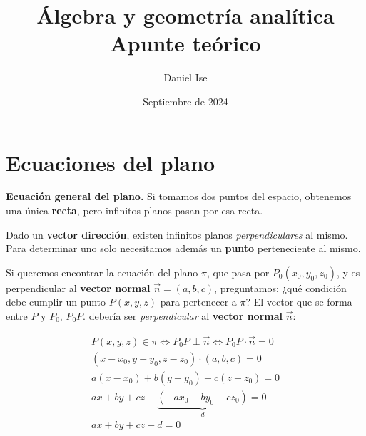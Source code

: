 \documentclass{article}
\title{Álgebra y geometría analítica\\Apunte teórico}
\author{Daniel Ise}
\date{Septiembre de 2024}
\begin{document}
\maketitle

\section*{Ecuaciones del plano}

\textbf{Ecuación general del plano.}
Si tomamos dos puntos del espacio,
obtenemos una única \textbf{recta},
pero infinitos planos pasan por esa recta.

Dado un \textbf{vector dirección},
existen infinitos planos \textit{perpendiculares} al mismo.
Para determinar uno solo necesitamos además un \textbf{punto}
perteneciente al mismo.

Si queremos encontrar la ecuación del plano \(\pi\),
que pasa por \(P_0 (x_0,y_0,z_0)\),
y es perpendicular al \textbf{vector normal} \(\vec{n} = (a,b,c)\),
preguntamos:
¿qué condición debe cumplir un punto \(P (x, y, z)\) para pertenecer a \(\pi\)?
El vector que se forma entre \(P\) y \(P_0\), \(\overline{P_0P}\).
debería ser \textit{perpendicular} al \textbf{vector normal} \(\vec{n}\):

\begin{align*}
    P (x, y, z) \in \pi \iff \overline{P_0P} \perp \vec{n} \iff \overline{P_0P} \cdot \vec{n} = 0 \\
    (x - x_0, y - y_0, z - z_0) \cdot (a, b, c) = 0                                               \\
    a (x - x_0) + b (y - y_0) + c (z - z_0) = 0                                                   \\
    ax + by + cz + \underbrace{(-ax_0 - by_0 - cz_0)}_{d} = 0                                     \\
    \boxed{ax + by + cz + d = 0}                                                                  \\
\end{align*}
\end{document}
